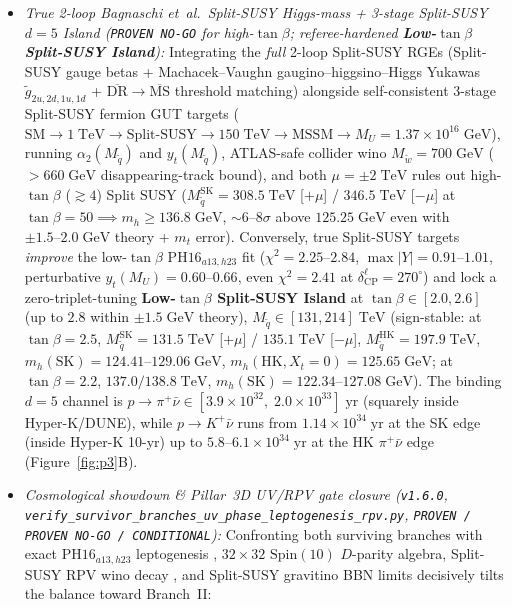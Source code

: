 \documentclass[11pt,a4paper]{article}
\begin{document}
\begin{enumerate}
\begin{itemize}
        \item \emph{True 2-loop Bagnaschi et~al.\ Split-SUSY Higgs-mass + 3-stage Split-SUSY $d=5$ Island (\texttt{PROVEN NO-GO} for high-$\tan\beta$; referee-hardened \textbf{Low-$\tan\beta$ Split-SUSY Island}):} Integrating the \emph{full} 2-loop Split-SUSY RGEs \cite{Bagnaschi2014} (Split-SUSY gauge betas + Machacek--Vaughn gaugino--higgsino--Higgs Yukawas $\tilde g_{2u,2d,1u,1d}$ + $\overline{\mathrm{DR}}\to\overline{\mathrm{MS}}$ threshold matching) alongside self-consistent 3-stage Split-SUSY fermion GUT targets ($\mathrm{SM}\to 1\;\mathrm{TeV}\to \mathrm{Split\text{-}SUSY}\to 150\;\mathrm{TeV}\to\mathrm{MSSM}\to M_U=1.37\times 10^{16}\;\mathrm{GeV}$), running $\alpha_2(M_{\tilde q})$ and $y_t(M_{\tilde q})$, ATLAS-safe collider wino $M_{\tilde w} = 700\;\mathrm{GeV}$ ($>660\;\mathrm{GeV}$ disappearing-track bound), and both $\mu = \pm 2\;\mathrm{TeV}$ rules out high-$\tan\beta$ ($\gtrsim 4$) Split SUSY ($M_{\tilde q}^{\mathrm{SK}}=308.5\;\mathrm{TeV}$ [$+\mu$] / $346.5\;\mathrm{TeV}$ [$-\mu$] at $\tan\beta=50 \implies m_h \ge 136.8\;\mathrm{GeV}$, $\sim 6\text{--}8\sigma$ above $125.25\;\mathrm{GeV}$ even with $\pm 1.5\text{--}2.0\;\mathrm{GeV}$ theory + $m_t$ error). Conversely, true Split-SUSY targets \emph{improve} the low-$\tan\beta$ $\mathrm{PH16}_{a13,h23}$ fit ($\chi^2 = 2.25\text{--}2.84$, $\max|Y|=0.91\text{--}1.01$, perturbative $y_t(M_U)=0.60\text{--}0.66$, even $\chi^2=2.41$ at $\delta_{\mathrm{CP}}^\ell=270^\circ$) and lock a zero-triplet-tuning \textbf{Low-$\tan\beta$ Split-SUSY Island} at $\tan\beta \in [2.0, 2.6]$ (up to $2.8$ within $\pm 1.5\;\mathrm{GeV}$ theory), $M_{\tilde q} \in [131, 214]\;\mathrm{TeV}$ (sign-stable: at $\tan\beta=2.5$, $M_{\tilde q}^{\mathrm{SK}}=131.5\;\mathrm{TeV}$ [$+\mu$] / $135.1\;\mathrm{TeV}$ [$-\mu$], $M_{\tilde q}^{\mathrm{HK}}=197.9\;\mathrm{TeV}$, $m_h(\mathrm{SK})=124.41\text{--}129.06\;\mathrm{GeV}$, $m_h(\mathrm{HK}, X_t=0)=125.65\;\mathrm{GeV}$; at $\tan\beta=2.2$, $137.0/138.8\;\mathrm{TeV}$, $m_h(\mathrm{SK})=122.34\text{--}127.08\;\mathrm{GeV}$). The binding $d=5$ channel is $p\to\pi^+\bar\nu \in [3.9\times 10^{32},\; 2.0\times 10^{33}]\;\mathrm{yr}$ (squarely inside Hyper-K/DUNE), while $p\to K^+\bar\nu$ runs from $1.14\times 10^{34}\;\mathrm{yr}$ at the SK edge (inside Hyper-K 10-yr) up to $5.8\text{--}6.1\times 10^{34}\;\mathrm{yr}$ at the HK $\pi^+\bar\nu$ edge (Figure~\ref{fig:p3}B).
        \item \emph{Cosmological showdown \& Pillar~3D UV/RPV gate closure (\texttt{v1.6.0}, \texttt{verify\_\allowbreak survivor\_\allowbreak branches\_\allowbreak uv\_\allowbreak phase\_\allowbreak leptogenesis\_\allowbreak rpv.py}, \texttt{PROVEN / PROVEN NO-GO / CONDITIONAL}):} Confronting both surviving branches with exact $\mathrm{PH16}_{a13,h23}$ leptogenesis \cite{DiBari2005,Pilaftsis2004}, $32\times 32$ $\mathrm{Spin}(10)$ $D$-parity algebra, Split-SUSY RPV wino decay \cite{Barbier2005}, and Split-SUSY gravitino BBN limits \cite{Kawasaki2018} decisively tilts the balance toward Branch~II:

\end{itemize}
\end{enumerate}
\end{document}
